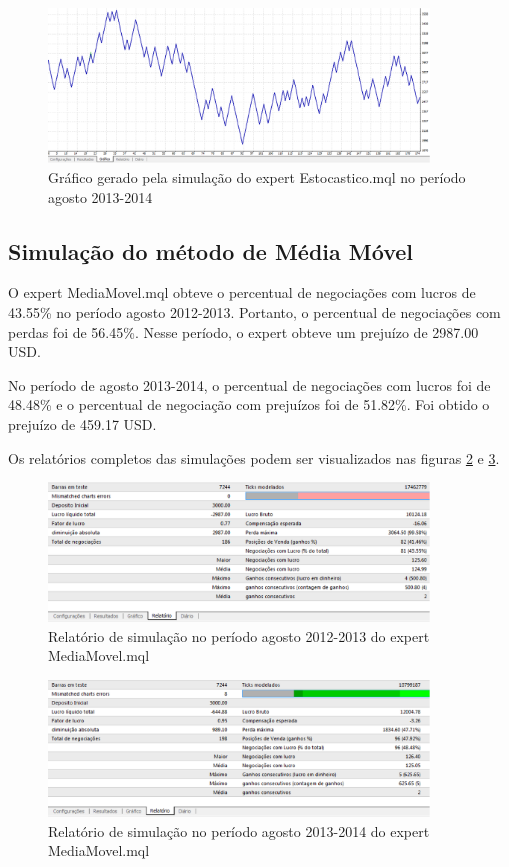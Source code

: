 \begin{figure}[H]
\centering
\includegraphics[width=0.9\textwidth]{figuras/protocoloEst4}
\caption{Gráfico gerado pela simulação do expert Estocastico.mql no período agosto 2013-2014} 
\label{protocoloEst4}
\end{figure}

\subsection{Simulação do método de Média Móvel}

O expert MediaMovel.mql obteve o percentual de negociações com lucros de 43.55\% no período agosto 2012-2013. Portanto, o percentual de negociações com perdas foi de 56.45\%. Nesse período, o expert obteve um prejuízo de 2987.00 USD. 

No período de agosto 2013-2014, o percentual de negociações com lucros foi de 48.48\% e o percentual de negociação com prejuízos foi de 51.82\%.  Foi obtido o prejuízo de 459.17 USD. 

Os relatórios completos das simulações podem ser visualizados nas figuras \ref{protocoloMedia} e \ref{protocoloMedia2}.

\begin{figure}[H]
\centering
\includegraphics[width=0.9\textwidth]{figuras/protocoloMedia}
\caption{Relatório de simulação no período agosto 2012-2013 do expert MediaMovel.mql} 
\label{protocoloMedia}
\end{figure}

\begin{figure}[H]
\centering
\includegraphics[width=0.9\textwidth]{figuras/protocoloMedia2}
\caption{Relatório de simulação no período agosto 2013-2014 do expert MediaMovel.mql} 
\label{protocoloMedia2}
\end{figure}

